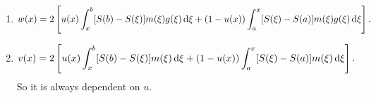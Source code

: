 \documentclass[12pt]{report}
\begin{document}
\begin{enumerate}[\bfseries A:]
\begin{enumerate}[\circlet]
\begin{equation*}
\begin{array}{c}
				\sigma^{2}=\sigma.
			\end{array}
		\end{equation*}
		so we have
		\begin{equation*}
			\begin{array}{>{\displaystyle}c}
				s(x)=e^{\frac{2\mu}{\sigma^{2}}}\\
				S(x)=Ae^{-\frac{2\mu}{\sigma^{2}}x}+B\qquad\text{for any }A,B\\
				\Downarrow\\
				u(x)=\frac{e^{-\frac{2\mu}{\sigma^{2}}x}-e^{-2\frac{\mu a}{\sigma^{2}}}}{e^{-\frac{2\mu b}{\sigma^{2}}}-e^{-\frac{2\mu a}{\sigma^{2}}}}.
			\end{array}
		\end{equation*}
	\end{enumerate}
	\item[\bfseries C:]
	\begin{equation*}
		w(x)=2\left[u(x)\int_{x}^{b}[S(b)-S(\xi)]m(\xi)g(\xi)\mathop{}\!\mathrm{d}\xi+(1-u(x))\int_{a}^{x}[S(\xi)-S(a)]m(\xi)g(\xi)\mathop{}\!\mathrm{d}\xi\right].
	\end{equation*}
	\item[\bfseries B:]
	\begin{equation*}
		v(x)=2\left[u(x)\int_{x}^{b}[S(b)-S(\xi)]m(\xi)\mathop{}\!\mathrm{d}\xi+(1-u(x))\int_{a}^{x}[S(\xi)-S(a)]m(\xi)\mathop{}\!\mathrm{d}\xi\right].
	\end{equation*}
	So it is always dependent on $u$.
\end{enumerate}
\end{document}
